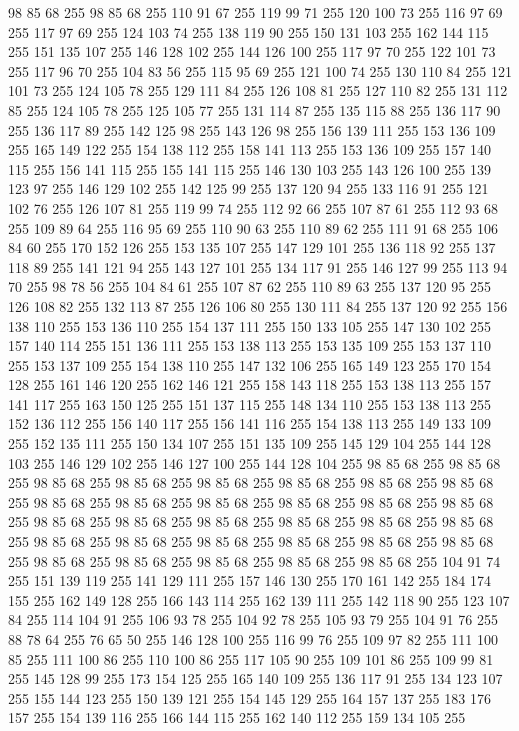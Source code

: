 98 85 68 255 98 85 68 255 110 91 67 255 119 99 71 255 120 100 73 255 116 97 69 255 117 97 69 255 124 103 74 255 138 119 90 255 150 131 103 255 162 144 115 255 151 135 107 255 146 128 102 255 144 126 100 255 117 97 70 255 122 101 73 255 117 96 70 255 104 83 56 255 115 95 69 255 121 100 74 255 130 110 84 255 121 101 73 255 124 105 78 255 129 111 84 255 126 108 81 255 127 110 82 255 131 112 85 255 124 105 78 255 125 105 77 255 131 114 87 255 135 115 88 255 136 117 90 255 136 117 89 255 142 125 98 255 143 126 98 255 156 139 111 255 153 136 109 255 165 149 122 255 154 138 112 255 158 141 113 255 153 136 109 255 157 140 115 255 156 141 115 255 155 141 115 255 146 130 103 255 143 126 100 255 139 123 97 255 146 129 102 255 142 125 99 255 137 120 94 255 133 116 91 255 121 102 76 255 126 107 81 255 119 99 74 255 112 92 66 255 107 87 61 255 112 93 68 255 109 89 64 255 116 95 69 255 110 90 63 255 110 89 62 255 111 91 68 255 106 84 60 255 170 152 126 255
153 135 107 255 147 129 101 255 136 118 92 255 137 118 89 255 141 121 94 255 143 127 101 255 134 117 91 255 146 127 99 255 113 94 70 255 98 78 56 255 104 84 61 255 107 87 62 255 110 89 63 255 137 120 95 255 126 108 82 255 132 113 87 255 126 106 80 255 130 111 84 255 137 120 92 255 156 138 110 255 153 136 110 255 154 137 111 255 150 133 105 255 147 130 102 255 157 140 114 255 151 136 111 255 153 138 113 255 153 135 109 255 153 137 110 255 153 137 109 255 154 138 110 255 147 132 106 255 165 149 123 255 170 154 128 255 161 146 120 255 162 146 121 255 158 143 118 255 153 138 113 255 157 141 117 255 163 150 125 255 151 137 115 255 148 134 110 255 153 138 113 255 152 136 112 255 156 140 117 255 156 141 116 255 154 138 113 255 149 133 109 255 152 135 111 255 150 134 107 255 151 135 109 255 145 129 104 255 144 128 103 255 146 129 102 255 146 127 100 255 144 128 104 255 98 85 68 255 98 85 68 255 98 85 68 255 98 85 68 255 98 85 68 255 98 85 68 255 98 85 68 255 98 85 68 255
98 85 68 255 98 85 68 255 98 85 68 255 98 85 68 255 98 85 68 255 98 85 68 255 98 85 68 255 98 85 68 255 98 85 68 255 98 85 68 255 98 85 68 255 98 85 68 255 98 85 68 255 98 85 68 255 98 85 68 255 98 85 68 255 98 85 68 255 98 85 68 255 98 85 68 255 98 85 68 255 98 85 68 255 98 85 68 255 98 85 68 255 104 91 74 255 151 139 119 255 141 129 111 255 157 146 130 255 170 161 142 255 184 174 155 255 162 149 128 255 166 143 114 255 162 139 111 255 142 118 90 255 123 107 84 255 114 104 91 255 106 93 78 255 104 92 78 255 105 93 79 255 104 91 76 255 88 78 64 255 76 65 50 255 146 128 100 255 116 99 76 255 109 97 82 255 111 100 85 255 111 100 86 255 110 100 86 255 117 105 90 255 109 101 86 255 109 99 81 255 145 128 99 255 173 154 125 255 165 140 109 255 136 117 91 255 134 123 107 255 155 144 123 255 150 139 121 255 154 145 129 255 164 157 137 255 183 176 157 255 154 139 116 255 166 144 115 255 162 140 112 255 159 134 105 255

